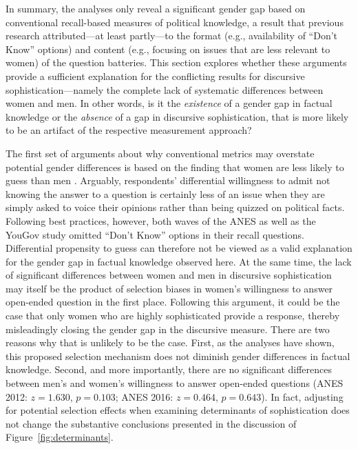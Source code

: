 In summary, the analyses only reveal a significant gender gap based on conventional recall-based measures of political knowledge, a result that previous research attributed---at least partly---to the format (e.g., availability of ``Don't Know'' options) and content (e.g., focusing on issues that are less relevant to women) of the question batteries. This section explores whether these arguments provide a sufficient explanation for the conflicting results for discursive sophistication---namely the complete lack of systematic differences between women and men. In other words, is it the \textit{existence} of a gender gap in factual knowledge or the \textit{absence} of a gap in discursive sophistication, that is more likely to be an artifact of the respective measurement approach?

The first set of arguments about why conventional metrics may overstate potential gender differences is based on the finding that women are less likely to guess than men \citep{mondak2004knowledge}. Arguably, respondents' differential willingness to admit not knowing the answer to a question is certainly less of an issue when they are simply asked to voice their opinions rather than being quizzed on political facts. Following best practices, however, both waves of the ANES as well as the YouGov study omitted ``Don't Know'' options in their recall questions. Differential propensity to guess can therefore not be viewed as a valid explanation for the gender gap in factual knowledge observed here. At the same time, the lack of significant differences between women and men in discursive sophistication may itself be the product of selection biases in women's willingness to answer open-ended question in the first place. Following this argument, it could be the case that only women who are highly sophisticated provide a response, thereby misleadingly closing the gender gap in the discursive measure. There are two reasons why that is unlikely to be the case. First, as the analyses have shown, this proposed selection mechanism does not diminish gender differences in factual knowledge. Second, and more importantly, there are no significant differences between men's and women's willingness to answer open-ended questions (ANES 2012: $z = 1.630$, $p = 0.103$; ANES 2016: $z = 0.464$, $p = 0.643$). In fact, adjusting for potential selection effects when examining determinants of sophistication does not change the substantive conclusions presented in the discussion of Figure~\ref{fig:determinants}.

